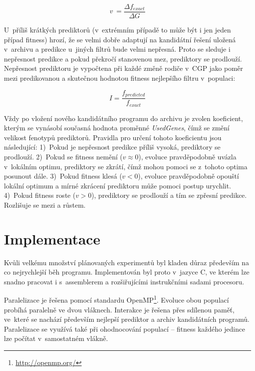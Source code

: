 \documentclass[czech]{ExcelAtFIT} %
\begin{document}
\begin{equation}
    \label{eq:velocity}
    v~= \frac{\Delta{}f_{\mathit{exact}}}{\Delta{}G}
\end{equation}

U~příliš krátkých prediktorů (v~extrémním případě to může být i jen jeden případ fitness) hrozí, že se velmi dobře adaptují na kandidátní řešení uložená v~archivu a predikce u~jiných filtrů bude velmi nepřesná. Proto se sleduje i nepřesnost predikce a pokud překročí stanovenou mez, prediktory se prodlouží. Nepřesnost prediktoru je vypočtena při každé změně rodiče v~CGP jako poměr mezi predikovanou a skutečnou hodnotou fitness nejlepšího filtru v~populaci:

\begin{equation}
    \mathit{I} = \frac{f_{\mathit{predicted}}}{f_{\mathit{exact}}}
\end{equation}

Vždy po vložení no\-vé\-ho kandidátního programu do archivu je zvolen koeficient, kterým se vynásobí současná hodnota proměnné \emph{UsedGenes}, čímž se změní velikost fenotypů prediktorů. Pravidla pro určení tohoto koeficientu jsou následující: 1)~Pokud je nepřesnost pre\-dikce příliš vysoká, pre\-dik\-to\-ry se prodlouží. 2)~Pokud se fitness nemění ($v \approx 0$), evoluce prav\-dě\-po\-dob\-ně uvázla v~lokálním op\-ti\-mu, pre\-dik\-tory se zkrátí, čímž mohou pomoci se z~tohoto op\-ti\-ma po\-su\-nout dále. 3)~Pokud fitness klesá ($v < 0$), evoluce prav\-dě\-po\-dobně opouští lokální optimum a mírné zkrácení prediktoru může pomoci postup urychlit. 4)~Pokud fitness roste ($v > 0$), prediktory se prodlouží a tím se zpřesní predikce. Rozlišuje se mezi  a  růstem.


\section{Implementace}
\label{sec:Implementation}

Kvůli velkému množství plánovaných experimentů byl kladen důraz především na co nejrychlejší běh programu. Implementován byl proto v~jazyce C, ve kterém lze snadno pracovat i s~assemblerem a rozšiřujícími instrukčními sadami procesoru.

Paralelizace je řešena pomocí standardu OpenMP\footnote{\url{http://openmp.org/}}. Evoluce obou populací probíhá paralelně ve dvou vlák\-nech. Interakce je řešena přes sdílenou paměť, ve~které se nachází především nejlepší prediktor a archiv kandidátních programů. Paralelizace se využívá také při ohodnocování populací -- fitness každého je\-din\-ce lze počítat v~samostatném vlákně.
\end{document}
